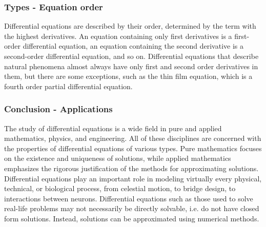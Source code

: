 \documentclass{beamer}
\begin{document}
  \begin{frame}
  \frametitle {Types - Equation order}
  Differential equations are described by their order, determined by the term with the highest derivatives. 
  An equation containing only first derivatives is a first-order differential equation, an equation containing the second derivative is a second-order differential equation, and so on. 
  Differential equations that describe natural phenomena almost always have only first and second order derivatives in them, but there are some exceptions, 
  such as the thin film equation, which is a fourth order partial differential equation.
  \end{frame}

\begin{frame}
\frametitle {Conclusion - Applications}
  The study of differential equations is a wide field in pure and applied mathematics, physics, and engineering. All of these disciplines are concerned with the properties of differential equations of various types. 
  Pure mathematics focuses on the existence and uniqueness of solutions, while applied mathematics emphasizes the rigorous justification of the methods for approximating solutions. 
  Differential equations play an important role in modeling virtually every physical, technical, or biological process, from celestial motion, to bridge design, to interactions between neurons. 
  Differential equations such as those used to solve real-life problems may not necessarily be directly solvable, i.e. do not have closed form solutions. Instead, solutions can be approximated using numerical methods.
\end{frame}
\end{document}
